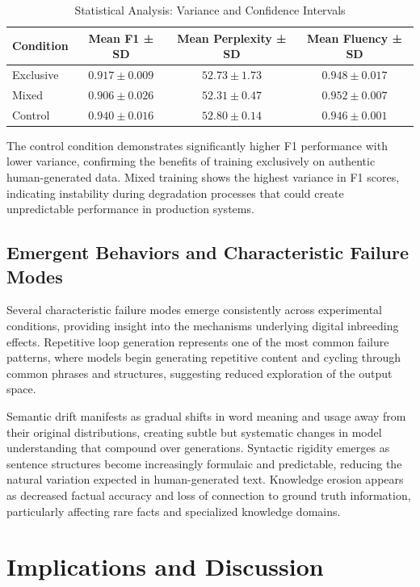 \documentclass{article}
\begin{document}
\begin{table}[h]
\centering
\caption{Statistical Analysis: Variance and Confidence Intervals}
\label{tab:statistical_analysis}
\begin{tabular}{lccc}
\toprule
\textbf{Condition} & \textbf{Mean F1 ± SD} & \textbf{Mean Perplexity ± SD} & \textbf{Mean Fluency ± SD} \\
\midrule
Exclusive & $0.917 \pm 0.009$ & $52.73 \pm 1.73$ & $0.948 \pm 0.017$ \\
Mixed & $0.906 \pm 0.026$ & $52.31 \pm 0.47$ & $0.952 \pm 0.007$ \\
Control & $0.940 \pm 0.016$ & $52.80 \pm 0.14$ & $0.946 \pm 0.001$ \\
\bottomrule
\end{tabular}
\end{table}

The control condition demonstrates significantly higher F1 performance with lower variance, confirming the benefits of training exclusively on authentic human-generated data. Mixed training shows the highest variance in F1 scores, indicating instability during degradation processes that could create unpredictable performance in production systems.

\subsection{Emergent Behaviors and Characteristic Failure Modes}

Several characteristic failure modes emerge consistently across experimental conditions, providing insight into the mechanisms underlying digital inbreeding effects. Repetitive loop generation represents one of the most common failure patterns, where models begin generating repetitive content and cycling through common phrases and structures, suggesting reduced exploration of the output space.

Semantic drift manifests as gradual shifts in word meaning and usage away from their original distributions, creating subtle but systematic changes in model understanding that compound over generations. Syntactic rigidity emerges as sentence structures become increasingly formulaic and predictable, reducing the natural variation expected in human-generated text. Knowledge erosion appears as decreased factual accuracy and loss of connection to ground truth information, particularly affecting rare facts and specialized knowledge domains.

\section{Implications and Discussion}
\end{document}
